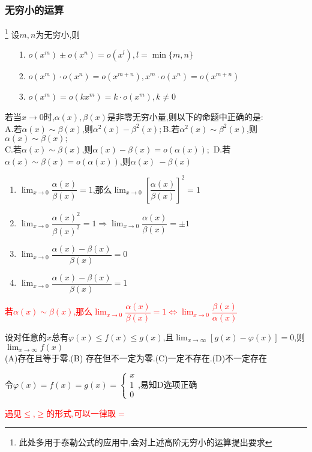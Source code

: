 \documentclass[8pt a4paper, oneside, UTF8]{ctexbook}
\begin{document}
\begin{sloppypar}
    \subsubsection{无穷小的运算}\footnote{此处多用于泰勒公式的应用中,会对上述高阶无穷小的运算提出要求}
    设$m,n$为无穷小,则
    \begin{itemize}
        \item[1.] $o(x^{m})\pm o(x^{n})=o(x^{l}),l=\min\{m,n\}$
        \item[2.] $o(x^{m})\cdot o(x^{n})=o(x^{m+n}),x^{m}\cdot o(x^{n})=o(x^{m+n})$
        \item[3.] $o(x^{m})=o(kx^{m})=k\cdot o(x^{m}),k \neq 0$
    \end{itemize}
    \begin{problem}
        若当$x\to0$时,$\alpha(x),\beta(x)$是非零无穷小量,则以下的命题中正确的是:\\
        A.若$\alpha(x)\sim\beta(x)$,则$\alpha^2(x)-\beta^2(x);$\quad B.若$\alpha^2(x)\sim\beta^2(x)$,则$\alpha(x)\sim\beta(x);$ \\ C.若$\alpha(x)\sim\beta(x)$,则$\alpha(x)-\beta(x)=o(\alpha(x));$ \quad D.若$\alpha(x) \sim \beta(x)=o(\alpha(x))$,则$\alpha(x)~-\beta(x)$
    \end{problem}
    \begin{solution}
        \begin{enumerate}
            \item $\lim_{x \to 0}\dfrac{\alpha(x)}{\beta(x)}=1$,那么$\lim_{x \to 0}[\dfrac{\alpha(x)}{\beta(x)}]^2=1$
            \item $\lim_{x\to 0}\dfrac{\alpha(x)^2}{\beta(x)^2}=1 \Rightarrow \lim_{x \to 0}\dfrac{\alpha(x)}{\beta(x)} = \pm 1$
            \item $\lim_{x \to 0}\dfrac{\alpha(x)-\beta(x)}{\beta(x)}=0$
            \item $\lim_{x\to 0}\dfrac{\alpha(x)-\beta(x)}{\beta(x)}=1$
        \end{enumerate}
    \end{solution}
    \begin{note}
        \textcolor{red}{若$\alpha(x) \sim \beta (x)$,那么$\lim_{x \to 0}\dfrac{\alpha(x)}{\beta(x)}=1 \Leftrightarrow \lim_{x\to 0}\dfrac{\beta(x)}{\alpha(x)}$}
    \end{note}
    \begin{problem}
        设对任意的$x$总有$\varphi(x)\leqslant f(x)\leqslant g(x)$,且$\lim_{x\to \infty}[g(x)-\varphi(x)]=0$,则$\lim_{x\to \infty}f(x)$\\
        (A)存在且等于零.\quad (B) 存在但不一定为零.\quad(C)一定不存在.\quad(D)不一定存在
    \end{problem}
    \begin{solution}
        令$\varphi(x)=f(x)=g(x)=\begin{cases} x\\1\\0 \end{cases}$,易知D选项正确
    \end{solution}
    \begin{note}
        \textcolor{red}{遇见$\leq$,$\geq$的形式,可以一律取$=$}
    \end{note}

\end{sloppypar}
\end{document}
